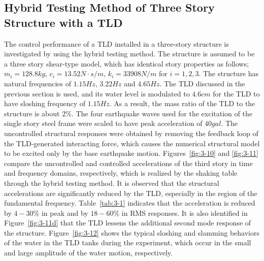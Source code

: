 \clearpage
\subsection{Hybrid Testing Method of Three Story Structure with a TLD}
The control performance of a TLD installed in a three-story structure is investigated by using the hybrid testing method. The structure is assumed to be a three story shear-type model, which has identical story properties as follows; $m_{i}=128.8kg$, $c_{i}=13.52N\cdot s/m$, $k_{i}=33908N/m$ for $i=1,2,3$. The structure has natural frequencies of $1.15Hz$, $3.22Hz$ and $4.65Hz$. The TLD discussed in the previous section is used, and its water level is modulated to $4.6cm$ for the TLD to have sloshing frequency of $1.15Hz$. As a result, the mass ratio of the TLD to the structure is about $2\%$. The four earthquake waves used for the excitation of the single story steel frame were scaled to have peak acceleration of $40gal$. The uncontrolled structural responses were obtained by removing the feedback loop of the TLD-generated interacting force, which causes the numerical structural model to be excited only by the base earthquake motion. 
Figures~\ref{fig:3-10} and \ref{fig:3-11} compare the uncontrolled and controlled accelerations of the third story in time and frequency domains, respectively, which is realized by the shaking table through the hybrid testing method. It is observed that the structural accelerations are significantly reduced by the TLD, especially in the region of the fundamental frequency. Table~\ref{tab:3-1} indicates that the acceleration is reduced by $4-30\%$ in peak and by $18-60\%$ in RMS responses. It is also identified in Figure~\ref{fig:3-11d} that the TLD lessens the additional second mode response of the structure. Figure~\ref{fig:3-12} shows the typical sloshing and slamming behaviors of the water in the TLD tanks during the experiment, which occur in the small and large amplitude of the water motion, respectively\citep{yalla2001liquid}.

